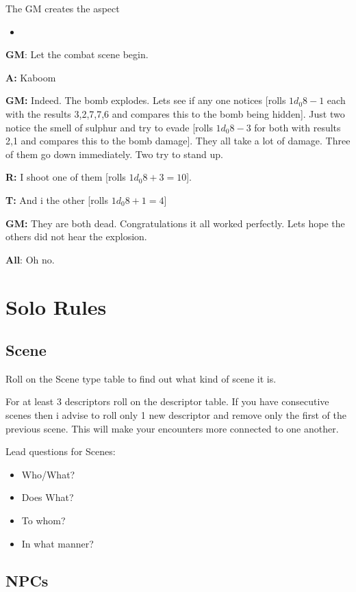 \documentclass[11pt]{article}
\begin{document}
{The GM creates the aspect
\begin{itemize}
\item {}
\end{itemize}

\textbf{GM}: Let the combat scene begin.

\textbf{A:} Kaboom

\textbf{GM:} Indeed. The bomb explodes. Lets see if any one notices [rolls \(1 d_0 8 - 1\) each with the results 3,2,7,7,6 and compares this to the bomb being hidden]. Just two notice the smell of sulphur and try to evade [rolls \(1 d_0 8 - 3\) for both with results 2,1 and compares this to the bomb damage]. They all take a lot of damage. Three of them go down immediately. Two try to stand up.

\textbf{R:} I shoot one of them [rolls \(1 d_0 8 + 3 = 10\)].

\textbf{T:} And i the other [rolls \(1 d_0 8 + 1 = 4\)]

\textbf{GM:} They are both dead. Congratulations it all worked perfectly. Lets hope the others did not hear the explosion.

\textbf{All}: Oh no.


\newpage

\section{Solo Rules}
\label{sec:org13a4f4f}

\subsection{Scene}
\label{sec:org14ff768}
Roll on the Scene type table to find out what kind of scene it is.

For at least 3 descriptors roll on the descriptor table. If you have consecutive scenes then i advise to roll only 1 new descriptor and remove only the first of the previous scene. This will make your encounters more connected to one another.

Lead questions for Scenes: 
\begin{itemize}
\item Who/What?
\item Does What?
\item To whom?
\item In what manner?
\end{itemize}

\subsection{NPCs}
\label{sec:orgbc68997}

}
\end{document}
